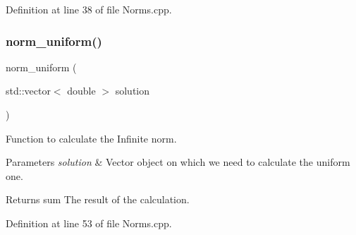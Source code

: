Definition at line 38 of file Norms.\+cpp.

\mbox{\label{_norms_8cpp_a87427a1c301886f335fd8485e638f9e2}} 
\subsubsection{norm\+\_\+uniform()}
{\footnotesize\ttfamily norm\+\_\+uniform (\begin{DoxyParamCaption}\item[{std\+::vector$<$ double $>$}]{solution }\end{DoxyParamCaption})}



Function to calculate the Infinite norm. 


\begin{DoxyParams}{Parameters}
{\em solution} & Vector object on which we need to calculate the uniform one. \\
\hline
\end{DoxyParams}
\begin{DoxyReturn}{Returns}
sum The result of the calculation. 
\end{DoxyReturn}


Definition at line 53 of file Norms.\+cpp.

